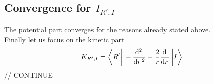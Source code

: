 \documentclass[10pt,a4paper]{article}
\DeclarePairedDelimiter\wBra{\bigg\langle}{\bigg\rvert}
\DeclarePairedDelimiter\wKet{\bigg\lvert}{\bigg\rangle}
\newcommand{\wbra}[1]{\wBra{#1}}
\newcommand{\wket}[1]{\wKet{#1}}
\newcommand{\wmatrixelement}[3]{\wbra{#1}\,#2\,\wket{#3}}
\newcommand{\de}[1]{\mathrm{d}#1\,}
\begin{document}
	\subsection{Convergence for $I_{R',I}$}
	The potential part converges for the reasons already stated above.\\
	Finally let us focus on the kinetic part
	\begin{equation}
		K_{R',I} = 
		\wmatrixelement{R'}{-\frac{\de{^2}}{\de{r}^2}-\frac{2}{r}\frac{\de{}}{\de{r}}}{I}
	\end{equation}
	// CONTINUE
	
	
\end{document}
